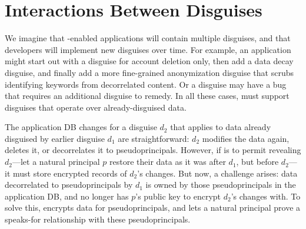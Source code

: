\section{Interactions Between Disguises}
\label{s:composition}

%
We imagine that \sys-enabled applications will contain multiple
disguises, and that developers will implement new disguises
over time.
%
For example, an application might start out with a disguise for account
deletion only, then add a data decay disguise, and finally add a more
fine-grained anonymization disguise that scrubs identifying keywords
from decorrelated content.
%
Or a disguise may have a bug that requires an additional disguise
to remedy.
%
In all these cases, \sys must support disguises that operate
over already-disguised data.
%

%
The application DB changes for a disguise $d_2$ that applies
to data already disguised by earlier disguise $d_1$ are
straightforward: $d_2$ modifies the data again, deletes it, or
decorrelates it to pseudoprincipals.
%
However, if \sys is to permit revealing $d_2$---\ie let a natural
principal $p$ restore their data as it was after $d_1$, but before
$d_2$---it must store encrypted records of $d_2$'s changes.
%
But now, a challenge arises: data decorrelated to pseudoprincipals
by $d_1$ is owned by those pseudoprincipals in the application DB,
and \sys no longer has $p$'s public key to encrypt $d_2$'s changes
with.
%
%
%
%
To solve this, \sys encrypts data for pseudoprincipals, and lets a
natural principal prove a speaks-for relationship with these
pseudoprincipals.
%
%
%
%

